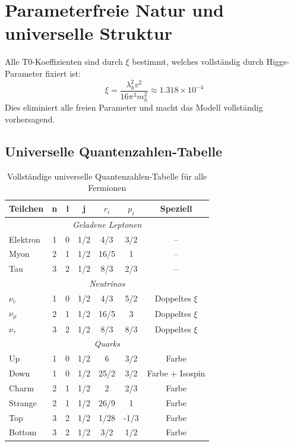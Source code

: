 	\section{Parameterfreie Natur und universelle Struktur}
	\label{sec:parameterfreie_natur}
	
	\begin{important}
		Alle T0-Koeffizienten sind durch $\xi$ bestimmt, welches vollständig durch Higgs-Parameter fixiert ist:
		\begin{equation}
			\xi = \frac{\lambda_h^2 v^2}{16\pi^3 m_h^2} \approx 1.318 \times 10^{-4}
		\end{equation}
		Dies eliminiert alle freien Parameter und macht das Modell vollständig vorhersagend.
	\end{important}
	
	\subsection{Universelle Quantenzahlen-Tabelle}
	\label{subsec:universal_quantum_table}
	
	\begin{table}[H]
		\centering
		\begin{tabular}{lcccccc}
			\toprule
			\textbf{Teilchen} & \textbf{n} & \textbf{l} & \textbf{j} & \textbf{$r_i$} & \textbf{$p_i$} & \textbf{Speziell} \\
			\midrule
			\multicolumn{7}{c}{\textit{Geladene Leptonen}} \\
			\midrule
			Elektron & 1 & 0 & 1/2 & 4/3 & 3/2 & -- \\
			Myon & 2 & 1 & 1/2 & 16/5 & 1 & -- \\
			Tau & 3 & 2 & 1/2 & 8/3 & 2/3 & -- \\
			\midrule
			\multicolumn{7}{c}{\textit{Neutrinos}} \\
			\midrule
			$\nu_e$ & 1 & 0 & 1/2 & 4/3 & 5/2 & Doppeltes $\xi$ \\
			$\nu_\mu$ & 2 & 1 & 1/2 & 16/5 & 3 & Doppeltes $\xi$ \\
			$\nu_\tau$ & 3 & 2 & 1/2 & 8/3 & 8/3 & Doppeltes $\xi$ \\
			\midrule
			\multicolumn{7}{c}{\textit{Quarks}} \\
			\midrule
			Up & 1 & 0 & 1/2 & 6 & 3/2 & Farbe \\
			Down & 1 & 0 & 1/2 & 25/2 & 3/2 & Farbe + Isospin \\
			Charm & 2 & 1 & 1/2 & 2 & 2/3 & Farbe \\
			Strange & 2 & 1 & 1/2 & 26/9 & 1 & Farbe \\
			Top & 3 & 2 & 1/2 & 1/28 & -1/3 & Farbe \\
			Bottom & 3 & 2 & 1/2 & 3/2 & 1/2 & Farbe \\
			\bottomrule
		\end{tabular}
		\caption{Vollständige universelle Quantenzahlen-Tabelle für alle Fermionen}
		\label{tab:universal_quantum_numbers}
	\end{table}
	
